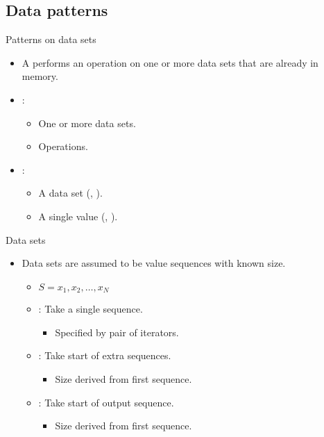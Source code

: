 \subsection{Data patterns}

\begin{frame}[t]{Patterns on data sets}
\begin{itemize}
  \item A  performs an operation on one 
        or more data sets that are already in memory.

  \vfill 
  \item {}:
    \begin{itemize}
      \item One or more data sets.
      \item Operations.
    \end{itemize}

  \vfill 
  \item {}:
    \begin{itemize}
      \item A data set (, ).
      \item A single value (, ).
    \end{itemize}
\end{itemize}
\end{frame}

\begin{frame}[t]{Data sets}
\begin{itemize}
  \item Data sets are assumed to be value sequences with known size.
    \begin{itemize}

      \vfill
      \item $S = x_1, x_2, \ldots , x_N$

      \vfill
      \item {}: Take a single sequence.
        \begin{itemize}
          \item Specified by pair of iterators.
        \end{itemize}

      \vfill
      \item {}: Take start of extra sequences.
        \begin{itemize}
          \item Size derived from first sequence.
        \end{itemize}

      \vfill
      \item {}: Take start of output sequence.
        \begin{itemize}
          \item Size derived from first sequence.
        \end{itemize}
    \end{itemize}
\end{itemize}
\end{frame}





